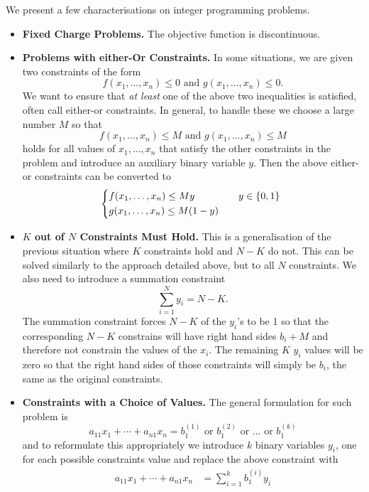 We present a few characterisations on integer programming problems.
\begin{itemize}
    \item \textbf{Fixed Charge Problems.} The objective function is discontinuous.
    \item \textbf{Problems with either-Or Constraints.} In some situations, we are given two constraints of the form
          \[f(x_1, \dots, x_n) \leq 0 \text{ and } g(x_1, \dots, x_n) \leq 0.\]
          We want to ensure that \textit{at least} one of the above two inequalities is satisfied, often call either-or constraints. In general, to handle these we choose a large number \(M\) so that
          \[f(x_1, \dots, x_n) \leq M \text{ and } g(x_1, \dots, x_n) \leq M\]
          holds for all values of \(x_1, \dots, x_n\) that satisfy the other constraints in the problem and introduce an auxiliary binary variable \(y\). Then the above either-or constraints can be converted to
          \[
              \begin{cases*}
                  f(x_1, \dots, x_n) \leq My \quad & \(\quad y \in \{0, 1\}\) \\
                  g(x_1, \dots, x_n) \leq M(1 - y)
              \end{cases*}
          \]
    \item \textbf{\(K\) out of \(N\) Constraints Must Hold.} This is a generalisation of the previous situation where \(K\) constraints hold and \(N - K\) do not. This can be solved similarly to the approach detailed above, but to all \(N\) constraints. We also need to introduce a summation constraint
          \[\sum_{i = 1}^N y_i = N - K.\]
          The summation constraint forces \(N - K\) of the \(y_i\)'s to be 1 so that the corresponding \(N - K\) constrains will have right hand sides \(b_i + M\) and therefore not constrain the values of the \(x_i\). The remaining \(K\) \(y_i\) values will be zero so that the right hand sides of those constraints will simply be \(b_i\), the same as the original constraints.
    \item \textbf{Constraints with a Choice of Values.} The general formulation for such problem is
          \[a_{11}x_1 + \cdots + a_{n1}x_n = b_1^{(1)} \text{ or } b_1^{(2)} \text{ or } \dots \text{ or } b_1^{(k)}\]
          and to reformulate this appropriately we introduce \(k\) binary variables \(y_i\), one for each possible constraints value and replace the above constraint with
          \begin{align*}
              a_{11}x_1 + \cdots + a_{n1}x_n & = \sum_{i = 1}^k b_1^{(i)}y_i \\

\end{align*}
\end{itemize}
